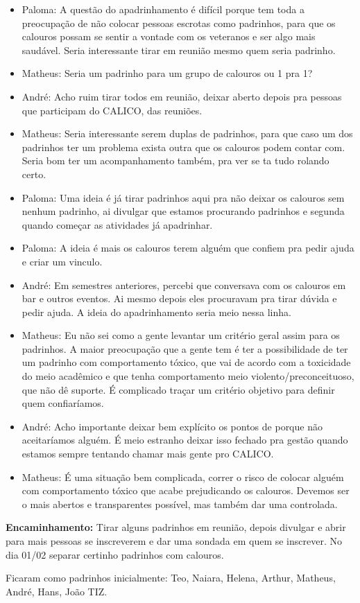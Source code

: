\documentclass{ata-calico}
\begin{document}
\begin{itemize}
\item Paloma: A questão do apadrinhamento é difícil porque tem toda a preocupação de não colocar pessoas escrotas como padrinhos, para que os calouros possam se sentir a vontade com os veteranos e ser algo mais saudável. Seria interessante tirar em reunião mesmo quem seria padrinho.
\item Matheus: Seria um padrinho para um grupo de calouros ou 1 pra 1?
\item André: Acho ruim tirar todos em reunião, deixar aberto depois pra pessoas que participam do CALICO, das reuniões.
\item Matheus: Seria interessante serem duplas de padrinhos, para que caso um dos padrinhos ter um problema exista outra que os calouros podem contar com. Seria bom ter um acompanhamento também, pra ver se ta tudo rolando certo.
\item Paloma: Uma ideia é já tirar padrinhos aqui pra não deixar os calouros sem nenhum padrinho, ai divulgar que estamos procurando padrinhos e segunda quando começar as atividades já apadrinhar.
\item Paloma: A ideia é mais os calouros terem alguém que confiem pra pedir ajuda e criar um vinculo.
\item André: Em semestres anteriores, percebi que conversava com os calouros em bar e outros eventos. Ai mesmo depois eles procuravam pra tirar dúvida e pedir ajuda. A ideia do apadrinhamento seria meio nessa linha.
\item Matheus: Eu não sei como a gente levantar um critério geral assim para os padrinhos. A maior preocupação que a gente tem é ter a possibilidade de ter um padrinho com comportamento tóxico, que vai de acordo com a toxicidade do meio acadêmico e que tenha comportamento meio violento/preconceituoso, que não dê suporte. É complicado traçar um critério objetivo para definir quem confiaríamos.
\item André: Acho importante deixar bem explícito os pontos de porque não aceitaríamos alguém. É meio estranho deixar isso fechado pra gestão quando estamos sempre tentando chamar mais gente pro CALICO.
\item Matheus: É uma situação bem complicada, correr o risco de colocar alguém com comportamento tóxico que acabe prejudicando os calouros. Devemos ser o mais abertos e transparentes possível, mas também dar uma controlada.
\end{itemize}

\textbf{Encaminhamento:} Tirar alguns padrinhos em reunião, depois divulgar e abrir para mais pessoas se inscreverem e dar uma sondada em quem se inscrever. No dia 01/02 separar certinho padrinhos com calouros.

Ficaram como padrinhos inicialmente: Teo, Naiara, Helena, Arthur, Matheus, André, Hans, João TIZ.

\end{document}
